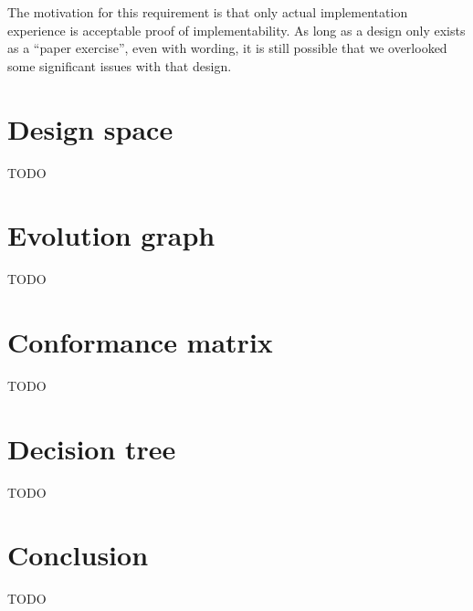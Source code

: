 The motivation for this requirement is that only actual implementation experience is acceptable proof of implementability. As long as a design only exists as a ``paper exercise'', even with wording, it is still possible that we overlooked some significant issues with that design.




\section{Design space}
\label{designs}

TODO

\section{Evolution graph}
\label{evolution}

TODO

\section{Conformance matrix}
\label{matrix}

TODO

\section{Decision tree}
\label{tree}

TODO

\section{Conclusion}
\label{conclusion}

TODO


